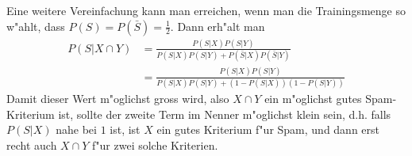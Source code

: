Eine weitere Vereinfachung kann man erreichen, wenn man die Trainingsmenge so
w"ahlt, dass $P(S)=P(\bar S)=\frac12$. Dann erh"alt man
\begin{align}
P(S|X\cap Y)
&=
\frac{P(S|X)P(S|Y)}{P(S|X)P(S|Y)+P(\bar S|X)P(\bar S|Y)}\nonumber
\\
&=
\frac{P(S|X)P(S|Y)}{P(S|X)P(S|Y)+(1-P(S|X))(1-P(S|Y))}
\end{align}
Damit dieser Wert m"oglichst gross wird, also $X\cap Y$ ein m"oglichst
gutes Spam-Kriterium ist, sollte der zweite Term im Nenner m"oglichst klein
sein, d.h. falls $P(S|X)$ nahe bei $1$ ist, ist $X$ ein gutes Kriterium f"ur
Spam, und dann erst recht auch $X\cap Y$ f"ur zwei solche Kriterien.
